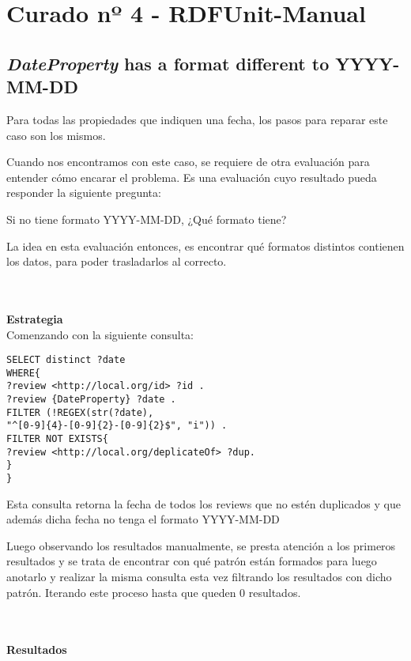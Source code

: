 \section{Curado nº 4 - RDFUnit-Manual}
\label{section:curado-manual}

\subsection*{\textit{DateProperty} has a format different to YYYY-MM-DD}
Para todas las propiedades que indiquen una fecha, los pasos para reparar este caso son los mismos.

Cuando nos encontramos con este caso, se requiere de otra evaluación para entender cómo encarar el problema. Es una evaluación cuyo resultado
pueda responder la siguiente pregunta:

Si no tiene formato YYYY-MM-DD, ¿Qué formato tiene?

La idea en esta evaluación entonces, es encontrar qué formatos distintos contienen los datos, para poder trasladarlos al correcto.

~\\\\ 
\textbf{Estrategia}\\
Comenzando con la siguiente consulta:

\newpage
\begin{lstlisting}[frame=single]  
SELECT distinct ?date 
WHERE{
?review <http://local.org/id> ?id .
?review {DateProperty} ?date .
FILTER (!REGEX(str(?date), 
"^[0-9]{4}-[0-9]{2}-[0-9]{2}$", "i")) .
FILTER NOT EXISTS{
?review <http://local.org/deplicateOf> ?dup.
}
}
\end{lstlisting}



Esta consulta retorna la fecha de todos los reviews que no estén duplicados y que además dicha fecha no tenga el formato YYYY-MM-DD

Luego observando los resultados manualmente, se presta atención a los primeros resultados y se trata de encontrar con qué patrón están formados 
para luego anotarlo y realizar la misma consulta esta vez filtrando los resultados con dicho patrón. Iterando este proceso hasta que 
queden 0 resultados.

~\\\\\textbf{Resultados}\\

